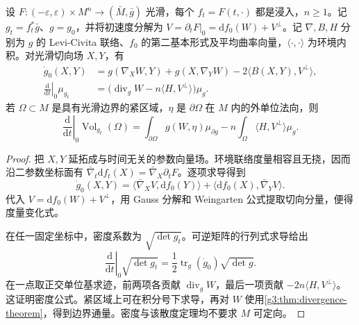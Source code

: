 \begin{theorem}[面积的一阶变分]\label{g3:thm:first-variation-submanifold-area}
	设 \(F:(-\varepsilon,\varepsilon)\times M^n\to(\bar M,\bar g)\) 光滑，每个 \(f_t=F(t,\cdot)\) 都是浸入，\(n\ge1\)。记 \(g_t=f_t^*\bar g\)、\(g=g_0\)，并将初速度分解为 \(V=\partial_tF|_0=\mathrm df_0(W)+V^\perp\)。记 \(\nabla,B,H\) 分别为 \(g\) 的 Levi-Civita 联络、\(f_0\) 的第二基本形式及平均曲率向量，\(\langle\cdot,\cdot\rangle\) 为环境内积。对光滑切向场 \(X,Y\)，有
	\begin{align}
		\dot g_0(X,Y)
		&=g(\nabla_XW,Y)+g(X,\nabla_YW)
		-2\langle B(X,Y),V^\perp\rangle,\label{g3:eq:variation-induced-metric}\\
		\left.\frac{\mathrm d}{\mathrm dt}\right|_0\mu_{g_t}
		&=\bigl(\operatorname{div}_gW-n\langle H,V^\perp\rangle\bigr)\mu_g.\label{g3:eq:variation-induced-density}
	\end{align}
	若 \(\Omega\subset M\) 是具有光滑边界的紧区域，\(\eta\) 是 \(\partial\Omega\) 在 \(M\) 内的外单位法向，则
	\begin{equation}\label{g3:eq:first-variation-area-integral}
		\left.\frac{\mathrm d}{\mathrm dt}\right|_0\operatorname{Vol}_{g_t}(\Omega)
		=\int_{\partial\Omega}g(W,\eta)\mu_{\partial g}
		-n\int_\Omega\langle H,V^\perp\rangle\mu_g.
	\end{equation}
\end{theorem}
\begin{proof}
	把 \(X,Y\) 延拓成与时间无关的参数向量场。环境联络度量相容且无挠，因而沿二参数坐标面有 \(\bar\nabla_t\mathrm df_t(X)=\bar\nabla_X\partial_tF\)。逐项求导得到
	\[
		\dot g_0(X,Y)
		=\langle\bar\nabla_XV,\mathrm df_0(Y)\rangle
		+\langle\mathrm df_0(X),\bar\nabla_YV\rangle.
	\]
	代入 \(V=\mathrm df_0(W)+V^\perp\)，用 Gauss 分解和 Weingarten 公式提取切向分量，便得度量变化式。

	在任一固定坐标中，密度系数为 \(\sqrt{\det g_t}\)。可逆矩阵的行列式求导给出
	\[
		\left.\frac{\mathrm d}{\mathrm dt}\right|_0\sqrt{\det g_t}
		=\frac12\operatorname{tr}_g(\dot g_0)\sqrt{\det g}.
	\]
	在一点取正交单位基求迹，前两项各贡献 \(\operatorname{div}_gW\)，最后一项贡献 \(-2n\langle H,V^\perp\rangle\)。这证明密度公式。紧区域上可在积分号下求导，再对 \(W\) 使用\cref{g3:thm:divergence-theorem}，得到边界通量。密度与该散度定理均不要求 \(M\) 可定向。
\end{proof}

